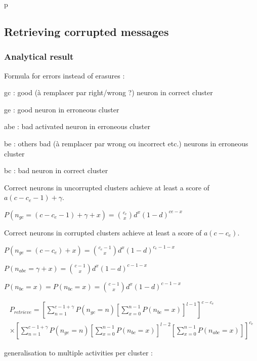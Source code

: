 \documentclass[english,11pt,twocolumn]{article}
\theoremstyle{definition}
\begin{document}
	\newpage
	p
	\newpage
	$\,$
	\newpage
	
	\subsection{Retrieving corrupted messages}
	
	\subsubsection{Analytical result}	
	Formula for errors instead of erasures : 
	
	gc : good (à remplacer par right/wrong ?) neuron in correct cluster
	
	ge : good neuron in erroneous cluster
	
	abe : bad activated neuron in erroneous cluster
	
	be : others bad (à remplacer par wrong ou incorrect etc.) neurons in erroneous cluster
	
	bc : bad neuron in correct cluster
	
	Correct neurons in uncorrupted clusters achieve at least a score of $a(c-c_e - 1) + \gamma$. 
	
	$P(n_{gc} = (c - c_e - 1) + \gamma + x) = {c_e \choose x} d^x (1-d)^{ce-x}$
	
	Correct neurons in corrupted clusters achieve at least a score of $a(c - c_e)$. 
	
	$P(n_{ge} = (c - c_e) + x) = {c_e - 1 \choose x} d^x (1-d)^{c_e-1-x}$
	
	$P(n_{abe} = \gamma + x) = {c - 1 \choose x} d^x (1-d)^{c-1-x}$
	
	$P(n_{be} = x) = P(n_{bc} = x) = {c - 1 \choose x} d^x (1-d)^{c- 1 -x}$
	
	
	
	\begin{align}
	P_{retrieve} = \left [ \sum_{n = 1}^{c-1+\gamma} P(n_{gc} = n) \left [ \sum_{x=0}^{n-1} P(n_{bc} = x) \right]^{l-1} \right ]^{c - c_e} \\ \times \left [ \sum_{n = 1}^{c-1+\gamma} P(n_{ge} = n) \left [ \sum_{x=0}^{n-1} P(n_{bc} = x) \right]^{l-2} \left [ \sum_{x=0}^{n-1} P(n_{abc} = x) \right] \right ]^{c_e}
	\end{align}

	
	
	generalisation to multiple activities per cluster :
	
\end{document}
